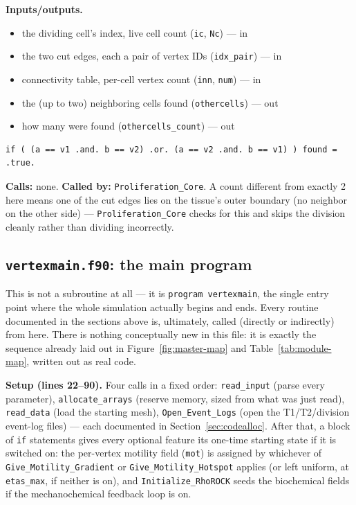 \documentclass[11pt]{article}
\begin{document}
\textbf{Inputs/outputs.}
\begin{itemize}[nosep]
  \item the dividing cell's index, live cell count (\texttt{ic}, \texttt{Nc}) --- in
  \item the two cut edges, each a pair of vertex IDs (\texttt{idx\_pair}) --- in
  \item connectivity table, per-cell vertex count (\texttt{inn}, \texttt{num}) --- in
  \item the (up to two) neighboring cells found (\texttt{othercells}) --- out
  \item how many were found (\texttt{othercells\_count}) --- out
\end{itemize}

\begin{lstlisting}[caption={Matching a cut edge in either vertex order, in \texttt{Find\_Others\_affected}.}]
if ( (a == v1 .and. b == v2) .or. (a == v2 .and. b == v1) ) found = .true.
\end{lstlisting}

\textbf{Calls:} none. \textbf{Called by:} \texttt{Proliferation\_Core}. A count
different from exactly 2 here means one of the cut edges lies on the tissue's outer
boundary (no neighbor on the other side) --- \texttt{Proliferation\_Core} checks for
this and skips the division cleanly rather than dividing incorrectly.
\subsection{\texttt{vertexmain.f90}: the main program}
\label{sec:codevertexmain}

This is not a subroutine at all --- it is \texttt{program vertexmain}, the single entry
point where the whole simulation actually begins and ends. Every routine documented in
the sections above is, ultimately, called (directly or indirectly) from here. There is
nothing conceptually new in this file: it is exactly the sequence already laid out in
Figure~\ref{fig:master-map} and Table~\ref{tab:module-map}, written out as real code.

\textbf{Setup (lines 22--90).} Four calls in a fixed order: \texttt{read\_input} (parse
every parameter), \texttt{allocate\_arrays} (reserve memory, sized from what was just
read), \texttt{read\_data} (load the starting mesh), \texttt{Open\_Event\_Logs} (open the
T1/T2/division event-log files) --- each documented in Section~\ref{sec:codealloc}.
After that, a block of \texttt{if} statements gives every optional feature its
one-time starting state if it is switched on: the per-vertex motility field
(\texttt{mot}) is assigned by whichever of \texttt{Give\_Motility\_Gradient} or
\texttt{Give\_Motility\_Hotspot} applies (or left uniform, at \texttt{etas\_max}, if
neither is on), and \texttt{Initialize\_RhoROCK} seeds the biochemical fields if the
mechanochemical feedback loop is on.
\end{document}
